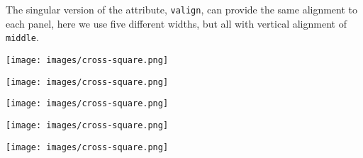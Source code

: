 \documentclass[10pt,]{article}
\theoremstyle{plain}
\theoremstyle{definition}
\theoremstyle{definition}
\theoremstyle{definition}
\theoremstyle{definition}
\theoremstyle{definition}
\theoremstyle{definition}
\numberwithin{equation}{section}
\newlength{\panelmax}
\begin{document}
\par
\hypertarget{p-664}{}%
The singular version of the attribute, \lstinline?valign?, can provide the same alignment to each panel, here we use five different widths, but all with vertical alignment of \lstinline?middle?.%
{%
\setlength{\panelmax}{0pt}
\ifdefined\panelboxAimage\else\newsavebox{\panelboxAimage}\fi%
\begin{lrbox}{\panelboxAimage}
\texttt{[image: images/cross-square.png]}
\end{lrbox}
\ifdefined\phAimage\else\newlength{\phAimage}\fi%
\setlength{\phAimage}{\ht\panelboxAimage+\dp\panelboxAimage}
\settototalheight{\phAimage}{\usebox{\panelboxAimage}}
\setlength{\panelmax}{\maxof{\panelmax}{\phAimage}}
\ifdefined\panelboxBimage\else\newsavebox{\panelboxBimage}\fi%
\begin{lrbox}{\panelboxBimage}
\texttt{[image: images/cross-square.png]}
\end{lrbox}
\ifdefined\phBimage\else\newlength{\phBimage}\fi%
\setlength{\phBimage}{\ht\panelboxBimage+\dp\panelboxBimage}
\settototalheight{\phBimage}{\usebox{\panelboxBimage}}
\setlength{\panelmax}{\maxof{\panelmax}{\phBimage}}
\ifdefined\panelboxCimage\else\newsavebox{\panelboxCimage}\fi%
\begin{lrbox}{\panelboxCimage}
\texttt{[image: images/cross-square.png]}
\end{lrbox}
\ifdefined\phCimage\else\newlength{\phCimage}\fi%
\setlength{\phCimage}{\ht\panelboxCimage+\dp\panelboxCimage}
\settototalheight{\phCimage}{\usebox{\panelboxCimage}}
\setlength{\panelmax}{\maxof{\panelmax}{\phCimage}}
\ifdefined\panelboxDimage\else\newsavebox{\panelboxDimage}\fi%
\begin{lrbox}{\panelboxDimage}
\texttt{[image: images/cross-square.png]}
\end{lrbox}
\ifdefined\phDimage\else\newlength{\phDimage}\fi%
\setlength{\phDimage}{\ht\panelboxDimage+\dp\panelboxDimage}
\settototalheight{\phDimage}{\usebox{\panelboxDimage}}
\setlength{\panelmax}{\maxof{\panelmax}{\phDimage}}
\ifdefined\panelboxEimage\else\newsavebox{\panelboxEimage}\fi%
\begin{lrbox}{\panelboxEimage}
\texttt{[image: images/cross-square.png]}
\end{lrbox}
\ifdefined\phEimage\else\newlength{\phEimage}\fi%
}
\end{document}
